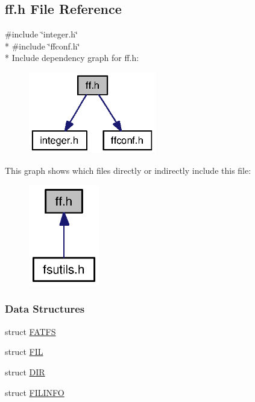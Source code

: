 \subsection{ff.\+h File Reference}
\label{ff_8h}
{\ttfamily \#include \char`\"{}integer.\+h\char`\"{}}\\*
{\ttfamily \#include \char`\"{}ffconf.\+h\char`\"{}}\\*
Include dependency graph for ff.\+h\+:
\nopagebreak
\begin{figure}[H]
\begin{center}
\leavevmode
\includegraphics[width=157pt]{ff_8h__incl}
\end{center}
\end{figure}
This graph shows which files directly or indirectly include this file\+:
\nopagebreak
\begin{figure}[H]
\begin{center}
\leavevmode
\includegraphics[width=87pt]{ff_8h__dep__incl}
\end{center}
\end{figure}
\subsubsection*{Data Structures}
\begin{DoxyCompactItemize}
\item 
struct \hyperlink{struct_f_a_t_f_s}{F\+A\+T\+F\+S}
\item 
struct \hyperlink{struct_f_i_l}{F\+I\+L}
\item 
struct \hyperlink{struct_d_i_r}{D\+I\+R}
\item 
struct \hyperlink{struct_f_i_l_i_n_f_o}{F\+I\+L\+I\+N\+F\+O}
\end{DoxyCompactItemize}
